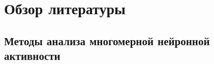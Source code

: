\chapter{Обзор литературы}\label{sec:lit}





\section{Методы анализа многомерной нейронной активности}

















\FloatBarrier
